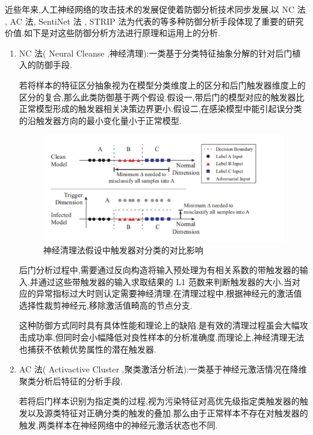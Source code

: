 近些年来,人工神经网络的攻击技术的发展促使着防御分析技术同步发展,以 NC 法 , AC 法, SentiNet 法 , STRIP 法为代表的等多种防御分析手段体现了重要的研究价值.如下是对这些防御分析方法进行原理和运用上的分析.
\begin{enumerate}
	\item NC 法( Neural Cleanse ,神经清理):一类基于分类特征抽象分解的针对后门植入的防御手段.
	
	若将样本的特征区分抽象视为在模型分类维度上的区分和后门触发器维度上的区分的复合,那么此类防御基于两个假设.假设一,带后门的模型对应的触发器比正常模型形成的触发器相关决策边界更小.假设二,在感染模型中能引起误分类的沿触发器方向的最小变化量小于正常模型\cite{NCfa}.
	
	\begin{figure}
		\centering
		\includegraphics[scale=0.55]{Figures/toudu.png}
		\caption{神经清理法假设中触发器对分类的对比影响}
	\end{figure}
	
	后门分析过程中,需要通过反向构造将输入预处理为有相关系数的带触发器的输入,并通过这些带触发器的输入求取结果的 L1 范数来判断触发器的大小.当对应的异常指标过大时则认定需要神经清理.在清理过程中,根据神经元的激活值选择性裁剪神经元,移除激活值畸高的节点分支.
	
	这种防御方式同时具有具体性能和理论上的缺陷.是有效的清理过程虽会大幅攻击成功率,但同时会小幅降低对良性样本的分析准确度.而理论上,神经清理无法也捕获不依赖优势属性的潜在触发器.
	
	\item AC 法( Activactive Cluster ,聚类激活分析法):一类基于神经元激活情况在降维聚类分析后特征的分析手段.
	
	若将后门样本识别为指定类的过程,视为污染特征对高优先级指定类触发器的触发以及源类特征对正确分类的触发的叠加.那么由于正常样本不存在对触发器的触发,两类样本在神经网络中的神经元激活状态也不同\cite{ACfa}.
	

\end{enumerate}

